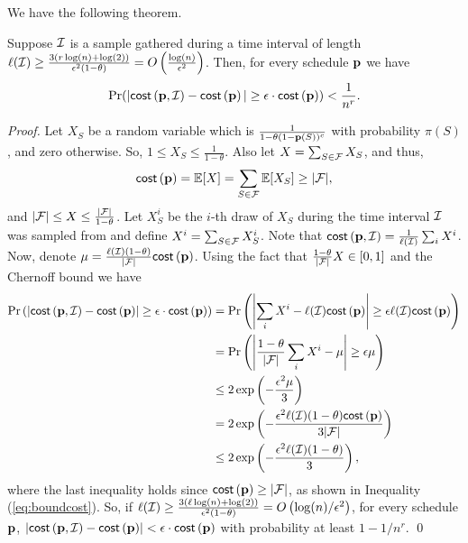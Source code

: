 	We have the following theorem.
	\begin{theorem}\label{thm:chernoffcost}
	Suppose $\mathcal{I}$ is a sample gathered during a time interval of length $\ell(\mathcal{I})
	\geq \frac{3(r\log(n)+\log(2))}{\epsilon^2(1-\theta)} =
	O\left(\frac{\log(n)}{\epsilon^2}\right)$. Then, for every schedule $\mathbf{p}$ we have
	$$\Pr(|\mathsf{cost}\left( \mathbf{p},\mathcal{I} \right) - \mathsf{cost}\left( \mathbf{p} \right)|\geq \epsilon\cdot\mathsf{cost}\left( \mathbf{p} \right)) < \frac{1}{n^r}.$$
	\end{theorem}
	\begin{proof}
	Let $X_S$ be a random variable which is $\frac{1}{1-\theta(1-\mathbf{p}(S))^c}$ with probability $\pi(S)$, and zero otherwise. So, $1\leq X_S \leq \frac{1}{1-\theta}$. Also let  $X = \sum_{S\in \mathcal{F}} X_S$, and thus, 
	\begin{equation}\label{eq:boundcost}
		\mathsf{cost}\left( \mathbf{p} \right) = \mathbb{E}[X] = \sum_{S\in\mathcal{F}} \mathbb{E}[X_{S}] \geq |\mathcal{F}|, 
\end{equation}
and $|\mathcal{F}| \leq X \leq \frac{|\mathcal{F}|}{1-\theta}$. Let $X^i_S$ be the $i$-th draw of $X_S$ during the time interval $\mathcal{I}$ was sampled from and define $X^i = \sum_{S\in\mathcal{F}}X_S^i$. Note that 
$\mathsf{cost}\left( \mathbf{p},\mathcal{I} \right) = \frac{1}{\ell(\mathcal{I})}\sum_{i}X^i$. Now, denote $\mu=\frac{\ell(\mathcal{I})(1-\theta)}{|\mathcal{F}|}\mathsf{cost}\left( \mathbf{p} \right)$. Using the fact that $\frac{1-\theta}{|\mathcal{F}|}X \in [0,1]$ and the Chernoff bound we have
\begin{align*}
\Pr\left(\left|\mathsf{cost}\left( \mathbf{p},\mathcal{I} \right) - \mathsf{cost}\left( \mathbf{p} \right)\right| \geq \epsilon \cdot \mathsf{cost}\left( \mathbf{p} \right)\right) 
&= 
\Pr\left(\left|\sum_i X^i - \ell(\mathcal{I})\mathsf{cost}\left( \mathbf{p} \right)\right| \geq \epsilon \ell(\mathcal{I}) \mathsf{cost}\left( \mathbf{p} \right)\right) \\
&=
\Pr\left(\left|\frac{1-\theta}{|\mathcal{F}|}\sum_i X^i - \mu\right| \geq \epsilon \mu\right) \\
&\leq 2\exp\left(-\frac{\epsilon^2\mu}{3}\right)\\
&=
2\exp\left(-\frac{\epsilon^2 \ell(\mathcal{I}) (1-\theta) \mathsf{cost}\left( \mathbf{p} \right)}{3|\mathcal{F}|}\right) \\
&\leq 
2\exp\left(-\frac{\epsilon^2 \ell(\mathcal{I}) (1-\theta)}{3}\right),
\end{align*}
where the last inequality holds since $\mathsf{cost}\left( \mathbf{p} \right)\geq |\mathcal{F}|$, as shown in Inequality (\ref{eq:boundcost}).
So, if $\ell(\mathcal{I}) \geq \frac{3 (\ell \log(n)+\log(2))}{\epsilon^2(1-\theta)} = O\left(\log(n)/\epsilon^2\right)$, for every schedule $\mathbf{p}$, $\left|\mathsf{cost}\left( \mathbf{p},\mathcal{I} \right) - \mathsf{cost}\left( \mathbf{p} \right)\right| < \epsilon \cdot \mathsf{cost}\left( \mathbf{p} \right)$ with probability at least $1-1/n^r$.
\qed
\end{proof}

